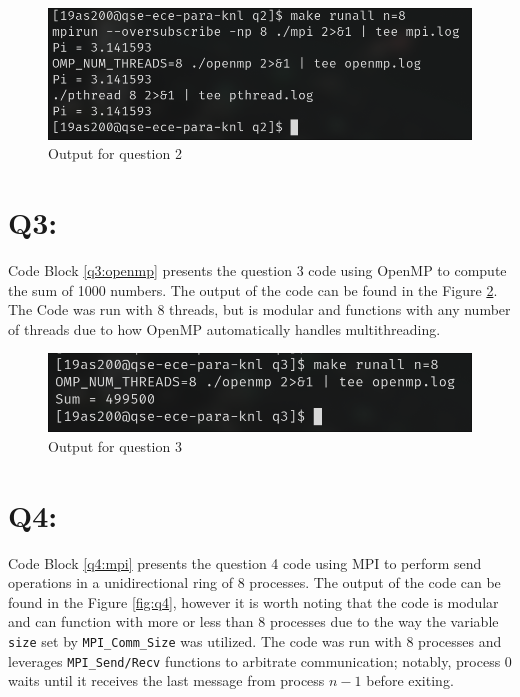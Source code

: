 \documentclass[11pt]{article}
\begin{document}





\begin{figure}[H]
\centering
    \includegraphics[width=\textwidth]{./images/q2.png}
\caption{Output for question 2}
\label{fig:q2}
\end{figure}

\newpage
\section*{Q3:}
Code Block \ref{q3:openmp} presents the question 3 code using OpenMP to compute the sum of 1000 numbers.
The output of the code can be found in the Figure \ref{fig:q3}.
The Code was run with 8 threads, but is modular and functions with any number of threads due to how OpenMP automatically handles multithreading.



\begin{figure}[H]
\centering
    \includegraphics[width=\textwidth]{./images/q3.png}
\caption{Output for question 3}
\label{fig:q3}
\end{figure}

\newpage
\section*{Q4:}
Code Block \ref{q4:mpi} presents the question 4 code using MPI to perform send operations in a unidirectional ring of 8 processes.
The output of the code can be found in the Figure \ref{fig:q4}, however it is worth noting that the code is modular and can function with more or less than 8 processes due to the way the variable \texttt{size} set by \texttt{MPI\_Comm\_Size} was utilized.
The code was run with 8 processes and leverages \texttt{MPI\_Send/Recv} functions to arbitrate communication; notably, process 0 waits until it receives the last message from process $n-1$ before exiting.
\end{document}
